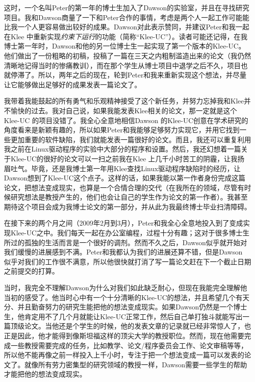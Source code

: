 \documentclass[12pt,UTF8,nofonts]{book}
\begin{document}
这时，一个名叫Peter的第一年的博士生加入了Dawson的实验室，并且在寻找研究项目。我和Dawson商量了一下和Peter合作的事情，考虑是两个人一起工作可能能比我一个人更容易做出较好的成果。Dawson对此表示赞同，并建议Peter和我一起在Klee 中重新实现\emph{约束下运行}的功能（简称“Klee-UC”）。读者可能还记得，在我博士第一年时，Dawson和他的另一位博士生一起实现了第一个版本的Klee-UC。他们做出了一份粗略的初稿，投稿了一篇在三天之内粗制滥造出来的论文（我仍然清晰地记得当时的惨痛教训），而在那个学生从博士项目中退学之后不久，项目也就停滞了。所以，两年之后的现在，轮到Peter和我来重新实现这个想法，并尽量让它能够做出足够好的成果发表一篇论文了。

我带着我能鼓起的所有勇气和乐观精神接受了这个新任务，并努力忘掉我和Klee并不愉快的过去。我对自己说，如果我能发表Klee相关的论文，那一定就是这个Klee-UC 的项目没错了。我全心全意地相信Dawson 的Klee-UC创意在学术研究的角度看来是新颖有趣的，所以如果Peter和我能够足够努力实现它，并用它找到一些更加重要的软件缺陷，我们就能发表一篇很好的论文。而且，我还可以重复利用我之前在Linux驱动程序的实验中大部分的程序和设置。然后，我还幻想着一篇关于Klee-UC的很好的论文可以一扫之前我在Klee 上几千小时苦工的阴霾，让我扬眉吐气。毕竟，还是我博士第一年用Klee查找Linux驱动程序缺陷时的经历，让Dawson想到了Klee-UC这个点子。这样的话，如果我能以第一作者身份完成这篇论文，把想法变成现实，也算是一个合情合理的交代（在我所在的领域，尽管有时候研究想法是教授产生的，他们也会让自己的学生作为论文的第一作者）。我甚至期待这个项目会成为我博士论文的第一部分，并从此为我最终博士毕业扫清障碍。

在接下来的两个月之间（2009年2月到3月），Peter和我全心全意地投入到了变成实现Klee-UC之中。我们每天一起在办公室编程，过程十分有趣；这对于很多博士生所过的孤独的生活而言是一个很好的调剂。然而不久之后，Dawson似乎就开始对我们缓慢的进展感到不满。Peter和我都认为我们的进展还算不错，但是Dawson 似乎对我们的工作很不满意，所以他很快就打消了写一篇论文赶在下一个截止日期之前提交的打算。

当时，我完全不理解Dawson为什么对我们如此缺乏耐心，但现在我能完全理解他当初的感受了。他当时心中有一个十分清晰的Klee-UC的想法，并且希望几个有天分、并且勤奋努力的研究生能把他的想法变成现实。如果Dawson仍然是一个博士生，他肯定用不了几个月就能让Klee-UC正常工作，然后自己单打独斗就能写出一篇顶级论文。当他还是个学生的时候，他的发表文章的记录就已经非常惊人了，也正是因此，他才能得到像斯坦福这样的顶尖大学的教授职位。然而，现在他需要完成一些教授需要完成的任务，比如教学、论文/程序委员会工作、论文审稿等等，所以他不能再像之前一样投入上千小时，专注于把一个想法变成一篇可以发表的论文了。就像所有劳力密集型的研究领域的教授一样，Dawson需要一些学生的帮助才能把他的想法变成现实。
\end{document}
